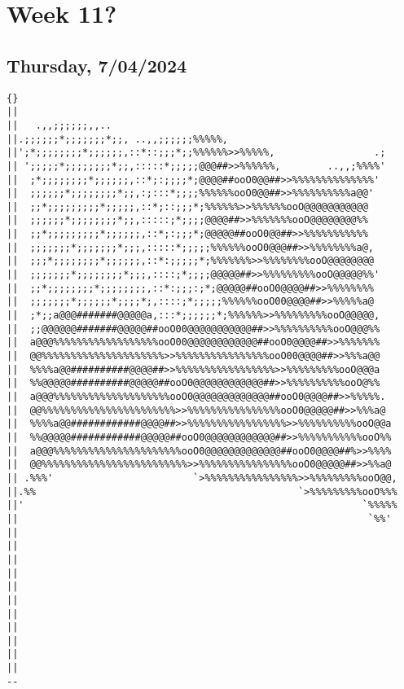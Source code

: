 \newpage
\section{Week 11?}

\subsection*{Thursday, 7/04/2024}
\begin{verbatim}
{} 
|| 
||   .,,;;;;;;,,.. 
||.;;;;;;*;;;;;;;*;;, ..,,;;;;;;%%%%%, 
||';*;;;;;;;;*;;;;;;,::*::;;;*;;%%%%%%>>%%%%%,                 .; 
|| ';;;;;*;;;;;;;;*;;,:::::*;;;;;@@@##>>%%%%%%,        ..,,;%%%%' 
||  ;*;;;;;;;;*;;;;;;,::*;:;;;;*;@@@@##ooO0@@##>>%%%%%%%%%%%%%%' 
||  ;;;;;;*;;;;;;;;*;;,:;:::*;;;;%%%%%%ooO0@@##>>%%%%%%%%%%a@@' 
||  ;;*;;;;;;;;;*;;;;;,::*;::;;;*;%%%%%%>>%%%%%%ooO@@@@@@@@@@@ 
||  ;;;;;;*;;;;;;;;*;;,:::::;*;;;;@@@@##>>%%%%%%%ooO@@@@@@@@%% 
||  ;;*;;;;;;;;;*;;;;;;,::*;:;;;*;@@@@@##ooO0@@##>>%%%%%%%%%%% 
||  ;;;;;;;*;;;;;;;*;;;,:::::*;;;;;%%%%%%ooO0@@@##>>%%%%%%%%a@, 
||  ;;;*;;;;;;;;*;;;;;;,::*:;;;;;*;%%%%%%%>>%%%%%%%%ooO@@@@@@@@ 
||  ;;;;;;;*;;;;;;;;*;;;,::::;*;;;;@@@@@##>>%%%%%%%%%ooO@@@@@%%' 
||  ;;*;;;;;;;;*;;;;;;;;,::*:;;;:;*;@@@@@##ooO0@@@@##>>%%%%%%%% 
||  ;;;;;;;*;;;;;;*;;;;*;,::::;*;;;;;%%%%%%ooO00@@@@##>>%%%%%a@ 
||  ;*;;a@@@#######@@@@@a,:::*;;;;;;*;%%%%%%>>%%%%%%%%%ooO@@@@@, 
||  ;;@@@@@@#######@@@@@##ooO00@@@@@@@@@@@##>>%%%%%%%%%%ooO@@@%% 
||  a@@@%%%%%%%%%%%%%%%%%%ooO00@@@@@@@@@@@@##ooO0@@@@##>>%%%%%%% 
||  @@%%%%%%%%%%%%%%%%%%%%%>>%%%%%%%%%%%%%%%%ooO00@@@@##>>%%%a@@ 
||  %%%%a@@##########@@@@##>>%%%%%%%%%%%%%%%%%>>%%%%%%%%%ooO@@@a 
||  %%@@@@@##########@@@@@##ooO0@@@@@@@@@@@@##>>%%%%%%%%%%ooO@%% 
||  a@@@%%%%%%%%%%%%%%%%%%%%ooO0@@@@@@@@@@@@@##ooO0@@@@##>>%%%%%. 
||  @@%%%%%%%%%%%%%%%%%%%%%%%>>%%%%%%%%%%%%%%%%ooO0@@@@@##>>%%%a@ 
||  %%%%a@@############@@@@##>>%%%%%%%%%%%%%%%%%>>%%%%%%%%%%ooO@@a 
||  %%@@@@@############@@@@@##ooO0@@@@@@@@@@@@##>>%%%%%%%%%%%ooO%% 
||  a@@@%%%%%%%%%%%%%%%%%%%%%%ooO0@@@@@@@@@@@@@##ooO0@@@@##%>>%%%% 
||  @@%%%%%%%%%%%%%%%%%%%%%%%%%>>%%%%%%%%%%%%%%%%ooO0@@@@@##>>%%a@ 
|| .%%%'                        `>%%%%%%%%%%%%%%%%>>%%%%%%%%%ooO@@, 
||.%%                                             `>%%%%%%%%%ooO%%% 
||'                                                          `%%%%% 
||                                                            `%%' 
|| 
|| 
|| 
|| 
|| 
|| 
|| 
|| 
|| 
|| 
|| 
--
\end{verbatim}

